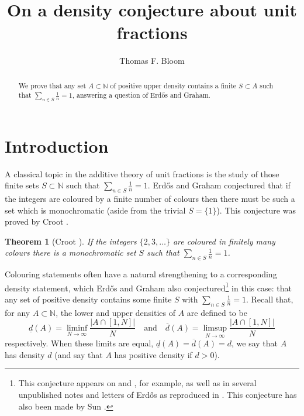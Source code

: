 \documentclass{amsart}
\newcommand{\bbn}{\mathbb{N}}
\newcommand{\abs}[1]{\left\lvert #1\right\rvert}
\newtheorem{theorem}{Theorem}
\begin{document}
\title{On a density conjecture about unit fractions}
\author{Thomas F. Bloom}
\address{Mathematical Institute\\Woodstock Road\\Oxford\\OX2 6GG, United Kingdom}

\begin{abstract}
We prove that any set $A\subset \bbn$ of positive upper density contains a finite $S\subset A$ such that $\sum_{n\in S}\frac{1}{n}=1$, answering a question of Erd\H{o}s and Graham.
\end{abstract}


\maketitle



\section{Introduction}

A classical topic in the additive theory of unit fractions is the study of those finite sets $S\subset \bbn$ such that $\sum_{n\in S}\frac{1}{n}=1$. Erd\H{o}s and Graham \cite{ErGr1980} conjectured that if the integers are coloured by a finite number of colours then there must be such a set which is monochromatic (aside from the trivial $S=\{1\}$). This conjecture was proved by Croot \cite{Cr2003}. 
\begin{theorem}[Croot \cite{Cr2003}]\label{th-croot}
If the integers $\{2,3,\ldots\}$ are coloured in finitely many colours there is a monochromatic set $S$ such that $\sum_{n\in S}\frac{1}{n}=1$.
\end{theorem}
Colouring statements often have a natural strengthening to a corresponding density statement, which Erd\H{o}s and Graham also conjectured\footnote{This conjecture appears on \cite[p. 36]{ErGr1980} and \cite[p. 298]{Gr2013}, for example, as well as in several unpublished notes and letters of Erd\H{o}s as reproduced in \cite{Gr2013}. This conjecture has also been made by Sun \cite{Su2007}.} in this case: that any set of positive density contains some finite $S$ with $\sum_{n\in S}\frac{1}{n}=1$. Recall that, for any $A\subset \bbn$, the lower and upper densities of $A$ are defined to be
\[\underline{d}(A) = \liminf_{N\to\infty}\frac{\abs{A\cap [1,N]}}{N}\quad\textrm{and}\quad\overline{d}(A) = \limsup_{N\to\infty}\frac{\abs{A\cap [1,N]}}{N}\]
respectively. When these limits are equal, $\underline{d}(A)=\overline{d}(A)=d$, we say that $A$ has density $d$ (and say that $A$ has positive density if $d>0$).
\end{document}

